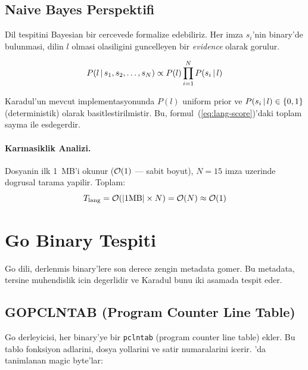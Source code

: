 \subsection{Naive Bayes Perspektifi}

Dil tespitini Bayesian bir cercevede formalize edebiliriz. Her imza $s_i$'nin binary'de bulunmasi, dilin $l$ olmasi olasiligini guncelleyen bir \emph{evidence} olarak gorulur.

\begin{equation}
\label{eq:naive-bayes-lang}
P(l \,|\, s_1, s_2, \ldots, s_N) \propto P(l) \prod_{i=1}^{N} P(s_i \,|\, l)
\end{equation}

Karadul'un mevcut implementasyonunda $P(l)$ uniform prior ve $P(s_i \,|\, l) \in \{0, 1\}$ (deterministik) olarak basitlestirilmistir. Bu, formul~(\ref{eq:lang-score})'daki toplam sayma ile esdegerdir.

\paragraph{Karmasiklik Analizi.} Dosyanin ilk 1~MB'i okunur ($\mathcal{O}\!\left(1\right)$ --- sabit boyut), $N = 15$ imza uzerinde dogrusal tarama yapilir. Toplam:
\begin{equation}
\label{eq:lang-complexity}
T_{\text{lang}} = \mathcal{O}\!\left(|\text{1MB}| \times N\right) = \mathcal{O}\!\left(N\right) \approx \mathcal{O}\!\left(1\right)
\end{equation}


\section{Go Binary Tespiti}
\label{sec:go-detection}

Go dili, derlenmis binary'lere son derece zengin metadata gomer. Bu metadata, tersine muhendislik icin degerlidir ve Karadul bunu iki asamada tespit eder.

\subsection{GOPCLNTAB (Program Counter Line Table)}

Go derleyicisi, her binary'ye bir \texttt{pclntab} (program counter line table) ekler. Bu tablo fonksiyon adlarini, dosya yollarini ve satir numaralarini icerir. 'da tanimlanan magic byte'lar:

